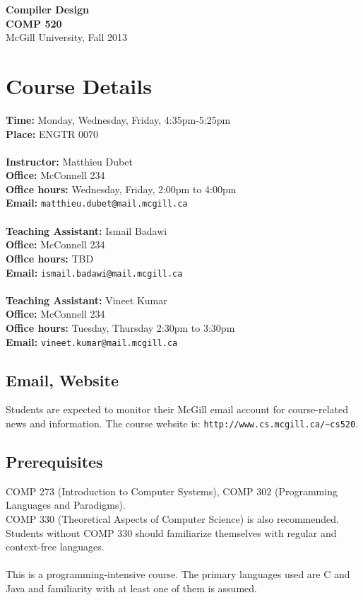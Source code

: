 \documentclass{article}
\begin{document}
\begin{center} \huge
\textbf{Compiler Design} \\
\textbf{COMP 520} \\
McGill University, Fall 2013
\end{center}
\section*{Course Details}
\textbf{Time:} Monday, Wednesday, Friday, 4:35pm-5:25pm \\
\textbf{Place:} ENGTR 0070 \\ \\
\textbf{Instructor:} Matthieu Dubet \\
\textbf{Office:} McConnell 234 \\
\textbf{Office hours:} Wednesday, Friday, 2:00pm to 4:00pm \\
\textbf{Email:} {\tt matthieu.dubet@mail.mcgill.ca} \\ \\
\textbf{Teaching Assistant:} Ismail Badawi \\
\textbf{Office:} McConnell 234 \\
\textbf{Office hours:} TBD \\
\textbf{Email:} {\tt ismail.badawi@mail.mcgill.ca} \\ \\
\textbf{Teaching Assistant:} Vineet Kumar \\
\textbf{Office:} McConnell 234 \\
\textbf{Office hours:} Tuesday,
Thursday 2:30pm to 3:30pm\\
\textbf{Email:} {\tt vineet.kumar@mail.mcgill.ca}

\subsection*{Email, Website}
Students are expected to monitor their McGill email account for course-related
news and information. The course website is: 
{\tt http://www.cs.mcgill.ca/\textasciitilde cs520}.

\subsection*{Prerequisites}
COMP 273 (Introduction to Computer Systems), COMP 302 (Programming
Languages and Paradigms). \\
COMP 330 (Theoretical Aspects of Computer Science) is also recommended.
Students without COMP 330 should familiarize themselves with regular and
context-free languages. \\ \\
This is a programming-intensive course. The primary languages used are C and
Java and familiarity with at least one of them is assumed.
\end{document}
